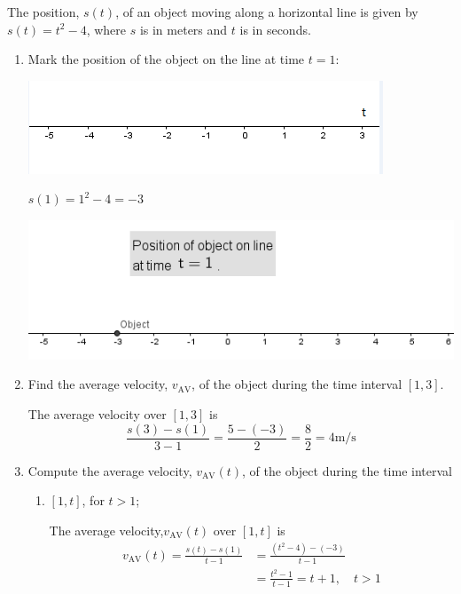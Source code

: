 \documentclass[nooutcomes,handout]{ximera}
\begin{document}
	
\begin{problem} 
The position, $s(t)$, of an object moving along a horizontal line is given by $s(t) = t^2 - 4$, where $s$ is in meters and $t$ is in seconds.
\begin{enumerate}
\item
Mark the position of the object on the line at time $t = 1$:
\begin{image}
\includegraphics[scale = 1]{Figure9.png}
\end{image} 

\begin{freeResponse}
$s(1)=1^2-4=-3$
\begin{image}
\includegraphics[scale = .8]{Figure8.png}
\end{image}
\end{freeResponse}


\item
Find the average velocity, $v_{\mathrm{AV}}$, of the object during the time interval $[1, 3]$.
\begin{freeResponse}
The average velocity over $[1, 3]$ is
\[
\frac{s(3) - s(1)}{3-1} = \frac{5 - (-3)}{2} = \frac{8}{2} = 4 \text{m/s}
\]
\end{freeResponse}


\item
Compute the average velocity, $v_{\mathrm{AV}}(t)$, of the object during the time interval
\begin{enumerate}
\item
$[1, t]$, for $t > 1$;
\begin{freeResponse}
The average velocity,$v_{\mathrm{AV}}(t)$ over $[1, t]$ is
\begin{align*}
v_{\mathrm{AV}}(t)=\frac{s(t) - s(1)}{t-1} &= \frac{(t^2-4) - (-3)}{t-1}\\
&= \frac{t^2-1}{t-1} = t+1,\quad t>1
\end{align*}
\end{freeResponse}


\end{enumerate}
\end{enumerate}
\end{problem}
\end{document}
